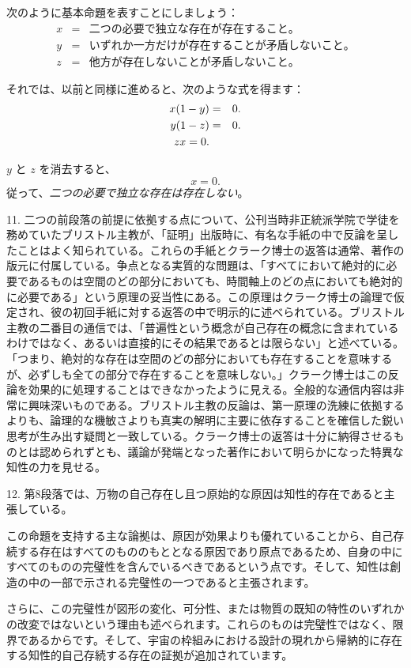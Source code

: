 \documentclass[a4paper,11pt,openany]{ltjsbook}
\begin{document}
次のように基本命題を表すことにしましょう：
\begin{eqnarray*}
x &=& \textrm{二つの必要で独立な存在が存在すること。}\\
y &=& \textrm{いずれか一方だけが存在することが矛盾しないこと。}\\
z &=& \textrm{他方が存在しないことが矛盾しないこと。}
\end{eqnarray*}

それでは、以前と同様に進めると、次のような式を得ます：
\begin{eqnarray}\setcounter{equation}{1}
x(1-y) &=& 0.\\
y(1-z) &=& 0.\\
zx = 0.
\end{eqnarray}

$y$ と $z$ を消去すると、
\[
x=0.
\]
従って、\textit{二つの必要で独立な存在は存在しない}。

11. 二つの前段落の前提に依拠する点について、公刊当時非正統派学院で学徒を務めていたブリストル主教が、「証明」出版時に、有名な手紙の中で反論を呈したことはよく知られている。これらの手紙とクラーク博士の返答は通常、著作の版元に付属している。争点となる実質的な問題は、「すべてにおいて絶対的に必要であるものは空間のどの部分においても、時間軸上のどの点においても絶対的に必要である」という原理の妥当性にある。この原理はクラーク博士の論理で仮定され、彼の初回手紙に対する返答の中で明示的に述べられている。ブリストル主教の二番目の通信では、「普遍性という概念が自己存在の概念に含まれているわけではなく、あるいは直接的にその結果であるとは限らない」と述べている。「つまり、絶対的な存在は空間のどの部分においても存在することを意味するが、必ずしも全ての部分で存在することを意味しない。」クラーク博士はこの反論を効果的に処理することはできなかったように見える。全般的な通信内容は非常に興味深いものである。ブリストル主教の反論は、第一原理の洗練に依拠するよりも、論理的な機敏さよりも真実の解明に主要に依存することを確信した鋭い思考が生み出す疑問と一致している。クラーク博士の返答は十分に納得させるものとは認められずとも、議論が発端となった著作において明らかになった特異な知性の力を見せる。

12. 第8段落では、万物の自己存在し且つ原始的な原因は知性的存在であると主張している。

この命題を支持する主な論拠は、原因が効果よりも優れていることから、自己存続する存在はすべてのもののもととなる原因であり原点であるため、自身の中にすべてのものの完璧性を含んでいるべきであるという点です。そして、知性は創造の中の一部で示される完璧性の一つであると主張されます。

さらに、この完璧性が図形の変化、可分性、または物質の既知の特性のいずれかの改変ではないという理由も述べられます。これらのものは完璧性ではなく、限界であるからです。そして、宇宙の枠組みにおける設計の現れから帰納的に存在する知性的自己存続する存在の証拠が追加されています。
\end{document}
